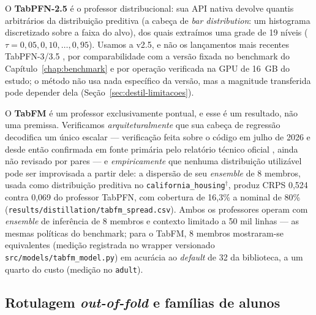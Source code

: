 O \textbf{TabPFN-2.5} \citep{hollmann2025,priorlabs2025} é o professor
distribucional: sua API nativa devolve quantis arbitrários da
distribuição preditiva (a cabeça de \emph{bar distribution}: um
histograma discretizado sobre a faixa do alvo), dos quais extraímos
uma grade de 19 níveis ($\tau = 0{,}05, 0{,}10, \ldots, 0{,}95$).
Usamos a v2.5, e não os lançamentos mais recentes TabPFN-3/3.5
\citep{tabpfn3-2026,tabpfn35tr2026}, por comparabilidade com a versão fixada no
benchmark do Capítulo~\ref{chap:benchmark} e por operação verificada
na GPU de 16~GB do estudo; o método não usa nada específico da
versão, mas a magnitude transferida pode depender dela
(Seção~\ref{sec:destil-limitacoes}).

O \textbf{TabFM} \citep{tabfm2026} é um professor exclusivamente
pontual, e esse é um resultado, não uma premissa. Verificamos
\emph{arquiteturalmente} que sua cabeça de regressão decodifica um
único escalar --- verificação feita sobre o código em julho de 2026 e
desde então confirmada em fonte primária pelo relatório técnico
oficial \citep{kong2026}, ainda não revisado por pares --- e
\emph{empiricamente} que nenhuma distribuição utilizável pode ser
improvisada a partir dele: a dispersão de seu \emph{ensemble} de 8 membros,
usada como distribuição preditiva no
\texttt{california\_\allowbreak housing}$^\dagger$,
produz CRPS 0,524 contra 0,069 do professor TabPFN, com cobertura de
16,3\% a nominal de 80\%
(\texttt{results/\allowbreak distillation/\allowbreak tabfm\_\allowbreak spread.\allowbreak csv}). Ambos os professores
operam com \emph{ensemble} de inferência de 8 membros e contexto limitado a
50 mil linhas --- as mesmas políticas do benchmark; para o TabFM, 8
membros mostraram-se equivalentes (medição registrada no wrapper versionado
\texttt{src/\allowbreak models/\allowbreak tabfm\_\allowbreak model.\allowbreak py}) em acurácia ao \emph{default} de 32 da
biblioteca, a um quarto do custo (medição no \texttt{adult}).

\subsection{Rotulagem \emph{out-of-fold} e famílias de alunos}
\label{sec:destil-alunos}

